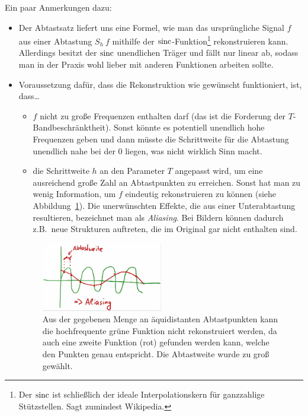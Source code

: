 \begin{remark}
Ein paar Anmerkungen dazu:
\begin{itemize}
\item Der Abtastsatz liefert uns eine Formel, wie man das ursprüngliche Signal $ f $ aus einer
  Abtastung $ S_{h} \ f $ mithilfe der $ \operatorname{sinc} $-Funktion\footnote{Der $ \operatorname{sinc} $ ist schließlich 
  der ideale Interpolationskern für ganzzahlige Stützstellen. Sagt zumindest Wikipedia.} 
  rekonstruieren kann. Allerdings besitzt der $ \operatorname{sinc} $ unendlichen Träger und fällt nur linear ab, 
  sodass man in der Praxis wohl lieber mit anderen Funktionen arbeiten sollte. 
\item Voraussetzung dafür, dass die Rekonstruktion wie gewünscht funktioniert, ist, dass\dots
  \begin{itemize}
  \item $ f $ nicht zu große Frequenzen enthalten darf (das ist die Forderung der
    $ T $-Bandbeschränktheit). Sonst könnte es potentiell unendlich hohe Frequenzen geben und dann
    müsste die Schrittweite für die Abtastung unendlich nahe bei der $ 0 $ liegen, was nicht
    wirklich Sinn macht.
  \item die Schrittweite $ h $ an den Parameter $ T $ angepasst wird, um eine ausreichend große 
    Zahl an Abtastpunkten zu erreichen. Sonst hat man zu wenig Information, um $ f $ eindeutig 
    rekonstruieren zu können (siehe Abbildung~\ref{fig:aliasing}). Die unerwünschten Effekte, die 
    aus einer Unterabtastung resultieren, bezeichnet man als \emph{Aliasing}. Bei Bildern können 
    dadurch z.B.\ neue Strukturen auftreten, die im Original gar nicht enthalten sind.
  \end{itemize}
  \begin{figure}[ht]
    	\centering
    \includegraphics[width=0.5\textwidth]{Bilder/Aliasing}
    	\caption{Aus der gegebenen Menge an äquidistanten Abtastpunkten kann die hochfrequente 
    	grüne Funktion nicht rekonstruiert werden, da auch eine zweite Funktion (rot) gefunden werden 
    	kann, welche den Punkten genau entspricht. Die Abtastweite wurde zu groß gewählt.}
    	\label{fig:aliasing}

\end{figure}
\end{itemize}
\end{remark}
